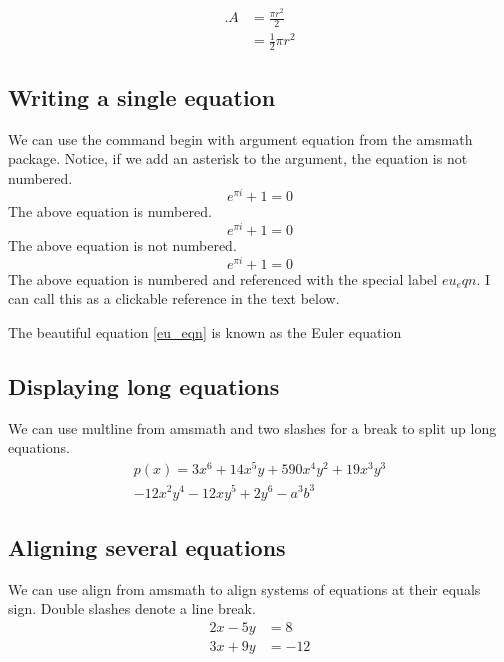 \documentclass{article}
\begin{document}
\begin{equation}
\begin{split}. %
A & = \frac{\pi r^2}{2} \\
 & = \frac{1}{2} \pi r^2
\end{split}
\end{equation}

\subsection{Writing a single equation}
We can use the command begin with argument equation from the amsmath package.  Notice, if we add an asterisk to the argument, the equation is not numbered.
\begin{equation} 
e^{\pi i} + 1 = 0
\end{equation}
The above equation is numbered. 
\begin{equation*}
e^{\pi i} + 1 = 0
\end{equation*}
The above equation is not numbered.
\begin{equation} \label{eu_eqn}
e^{\pi i} + 1 = 0
\end{equation}
The above equation is numbered and referenced with the special label $eu_eqn$.  I can call this as a clickable reference in the text below.

The beautiful equation \ref{eu_eqn} is known as the Euler equation

\subsection{Displaying long equations}
We can use multline from amsmath and two slashes for a break to split up long equations.
\begin{multline*}
p(x) = 3x^6 + 14x^5y + 590x^4y^2 + 19x^3y^3 \\  %
- 12x^2y^4 - 12xy^5 + 2y^6 - a^3b^3
\end{multline*}


\subsection{Aligning several equations}
We can use align from amsmath to align systems of equations at their equals sign.  Double slashes denote a line break.
\begin{align*} 
2x - 5y &=  8 \\ 
3x + 9y &=  -12
\end{align*}
\end{document}
